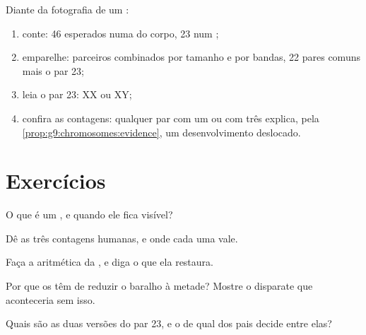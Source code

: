 \begin{method}\label{met:g9:chromosomes:read}
Diante da fotografia de um :
\begin{enumerate}
  \item conte: 46 esperados numa  do corpo, 23 num
        ;
  \item emparelhe: parceiros combinados por tamanho e por
        bandas, 22 pares comuns mais o par 23;
  \item leia o par 23: XX ou XY;
  \item confira as contagens: qualquer par com um ou com
        três  explica, pela
        \cref{prop:g9:chromosomes:evidence}, um
        desenvolvimento deslocado.
\end{enumerate}
\end{method}

\section{Exercícios}

\begin{exercise}[$\star$]\label{exo:g9:chromosomes:1}
O que é um , e quando ele fica visível?
\end{exercise}

\begin{exercise}[$\star$]\label{exo:g9:chromosomes:2}
Dê as três contagens humanas, e onde cada uma vale.
\end{exercise}

\begin{exercise}[$\star$]\label{exo:g9:chromosomes:3}
Faça a aritmética da , e diga o que ela
restaura.
\end{exercise}

\begin{exercise}[$\star$]\label{exo:g9:chromosomes:4}
Por que os  têm de reduzir o baralho à metade?
Mostre o disparate que aconteceria sem isso.
\end{exercise}

\begin{exercise}[$\star$]\label{exo:g9:chromosomes:5}
Quais são as duas versões do par 23, e o  de qual dos
pais decide entre elas?
\end{exercise}

